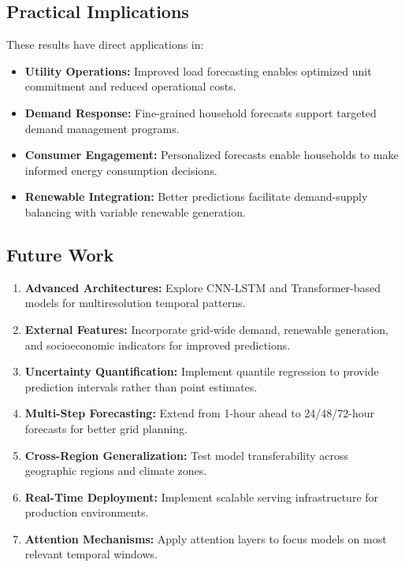 \documentclass[11pt, a4paper, oneside]{article}
\begin{document}
\subsection{Practical Implications}

These results have direct applications in:
\begin{itemize}
    \item \textbf{Utility Operations:} Improved load forecasting enables optimized unit commitment and reduced operational costs.
    \item \textbf{Demand Response:} Fine-grained household forecasts support targeted demand management programs.
    \item \textbf{Consumer Engagement:} Personalized forecasts enable households to make informed energy consumption decisions.
    \item \textbf{Renewable Integration:} Better predictions facilitate demand-supply balancing with variable renewable generation.
\end{itemize}

\subsection{Future Work}

\begin{enumerate}
    \item \textbf{Advanced Architectures:} Explore CNN-LSTM and Transformer-based models for multiresolution temporal patterns.
    
    \item \textbf{External Features:} Incorporate grid-wide demand, renewable generation, and socioeconomic indicators for improved predictions.
    
    \item \textbf{Uncertainty Quantification:} Implement quantile regression to provide prediction intervals rather than point estimates.
    
    \item \textbf{Multi-Step Forecasting:} Extend from 1-hour ahead to 24/48/72-hour forecasts for better grid planning.
    
    \item \textbf{Cross-Region Generalization:} Test model transferability across geographic regions and climate zones.
    
    \item \textbf{Real-Time Deployment:} Implement scalable serving infrastructure for production environments.
    
    \item \textbf{Attention Mechanisms:} Apply attention layers to focus models on most relevant temporal windows.
\end{enumerate}
\end{document}
